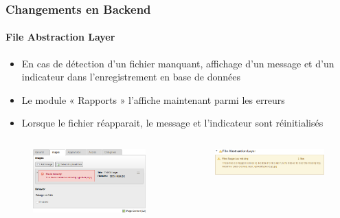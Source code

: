\begin{frame}[fragile]
	\frametitle{Changements en Backend}
	\framesubtitle{File Abstraction Layer}

	\begin{itemize}
		\item En cas de détection d'un fichier manquant, affichage d'un message et d'un indicateur dans l'enregistrement en base de données
		\item Le module « Rapports » l'affiche maintenant parmi les erreurs
		\item Lorsque le fichier réapparait, le message et l'indicateur sont réinitialisés
	\end{itemize}

	\begin{columns}[T]

		\begin{column}{.5\textwidth}
			\begin{figure}
				\includegraphics[width=0.95\linewidth]{Images/BackendChanges/FalMissingFileContentElement.png}
			\end{figure}
		\end{column}

		\begin{column}{.5\textwidth}
			\begin{figure}
				\includegraphics[width=0.95\linewidth]{Images/BackendChanges/FalMissingFileReportsModule.png}
			\end{figure}
		\end{column}

	\end{columns}

\end{frame}

